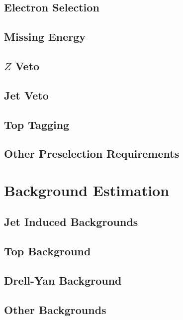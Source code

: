 \documentclass{cmspaper}
\begin{document}
   \subsection{Electron Selection}
     \label{sec:sel_electrons}
     
   \subsection{Missing Energy}
     \label{sec:sel_met}
     
   \subsection{$Z$ Veto}
     \label{sec:sel_zveto}
     
   \subsection{Jet Veto}
     \label{sec:sel_jets}
     
  \subsection{Top Tagging}
     \label{sec:sel_toptag}
      
   \subsection{Other Preselection Requirements}
     \label{sec:sel_other}
     

\clearpage
\section{Background Estimation}
    \label{sec:backgrounds}
    
    \label{sec:bkg_intro}
  \subsection{Jet Induced Backgrounds}
    \label{sec:bkg_fakes}
    
  \subsection{Top Background}
    \label{sec:bkg_top}
    
  \subsection{Drell-Yan Background}
    \label{sec:bkg_dy}
    
  \subsection{Other Backgrounds}
    \label{sec:bkg_other}
    
\end{document}
